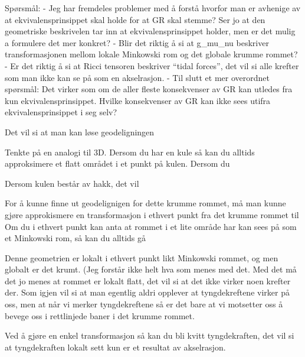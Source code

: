 Spørsmål:
- Jeg har fremdeles problemer med å forstå hvorfor man er avhenige av at ekvivalensprinsippet skal holde for at GR skal stemme? Ser jo at den geometriske beskrivelen tar inn at ekvivalensprinsippet holder, men er det mulig a formulere det mer konkret? 
- Blir det riktig å si at g_{mu_nu} beskriver transformasjonen mellom lokale Minkowski rom og det globale krumme rommet? 
- Er det riktig å si at Ricci tensoren beskriver ``tidal forces'', det vil si alle krefter som man ikke kan se på som en akselrasjon. 
- Til slutt et mer overordnet spørsmål: Det virker som om de aller fleste konsekvenser av GR kan utledes fra kun ekvivalensprinsippet. Hvilke konsekvenser av GR kan ikke sees utifra ekvivalensprinsippet i seg selv? 























Det vil si at man kan løse geodeligningen



Tenkte på en analogi til 3D. Dersom du har en kule så kan du alltids approksimere et flatt området i et punkt på kulen. Dersom du 

Dersom kulen består av hakk, det vil

For å kunne finne ut geodelignigen for dette krumme rommet, må man kunne gjøre approkismere  en transformasjon i ethvert punkt fra det krumme rommet til  
Om du i ethvert punkt kan anta at rommet i et lite område har kan sees på som et Minkowski rom, så kan du alltids gå 




Denne geometrien er lokalt i ethvert punkt likt Minkowski rommet, og men globalt er det krumt. (Jeg forstår ikke helt hva som menes med det. Med det må det jo menes at rommet er lokalt flatt, det vil si at det ikke virker noen krefter der. Som igjen vil si at man egentlig aldri opplever at tyngdekreftene virker på oss, men at når vi merker tyngdekreftene så er det bare at vi motsetter oss å bevege oss i rettlinjede baner i det krumme rommet.


Ved å gjøre en enkel transformasjon så kan du bli kvitt tyngdekraften, det vil si at tyngdekraften lokalt sett kun er et resultat av akselrasjon. 

